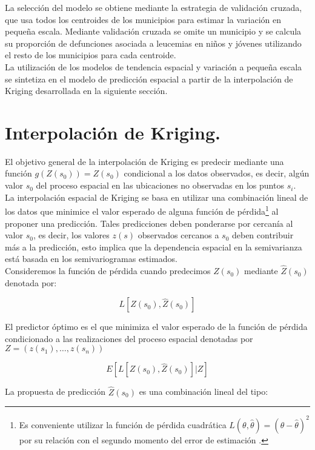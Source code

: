 \documentclass[11pt, oneside]{book}
\begin{document}
La selección del modelo se obtiene mediante la estrategia de validación cruzada, que usa todos los centroides de los municipios para estimar la variación en pequeña escala. Mediante validación cruzada se omite un municipio y se calcula su proporción de defunciones asociada a leucemias en niños y jóvenes utilizando el resto de los municipios para cada centroide.\\

La utilización de los modelos de tendencia espacial y variación a pequeña escala se sintetiza en el modelo de predicción espacial a partir de la interpolación de Kriging desarrollada en la siguiente sección.

\bigskip

\section{Interpolación de Kriging.}
El objetivo general de la interpolación de Kriging es predecir mediante una función $g(Z(s_0))=Z(s_0)$ condicional a los datos observados, es decir, algún valor $s_0$ del proceso espacial en las ubicaciones no observadas en los puntos $s_i$.\\ 

La interpolación espacial de Kriging se basa en utilizar una combinación lineal de los datos que minimice el valor esperado de alguna función de pérdida\footnote{Es conveniente utilizar la función de pérdida cuadrática $L(\theta,\hat{\theta})=(\theta-\hat{\theta})^2$ por su relación con el segundo momento del error de estimación \cite{cressie}.} al proponer una predicción. Tales predicciones deben ponderarse por cercanía al valor $s_0$, es decir, los valores $z(s)$ observados cercanos a $s_0$ deben contribuir más a la predicción, esto implica que la dependencia espacial en la semivarianza está basada en los semivariogramas estimados.\\

Consideremos la función de pérdida cuando predecimos $Z(s_0)$ mediante $\hat{Z}(s_0)$ denotada por: 

$$L[Z(s_0),\hat{Z}(s_0)]$$

\bigskip

El predictor óptimo es el que minimiza el valor esperado de la función de pérdida condicionado a las realizaciones del proceso espacial denotadas por $Z=(z(s_1),\ldots,z(s_n))$

$$E[L[Z(s_0),\hat{Z}(s_0)]|Z]$$

\bigskip

La propuesta de predicción $\hat{Z}(s_0)$ es una combinación lineal del tipo:
\end{document}
